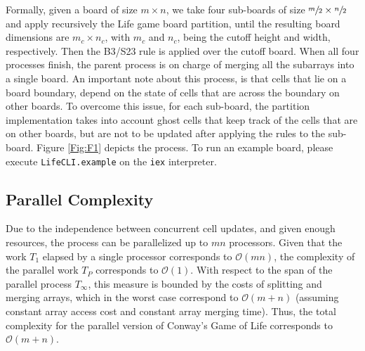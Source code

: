 \documentclass{article}
\begin{document}
Formally, given a board of size $m \times n$, we take four sub-boards of size $\sfrac{m}{2} \times \sfrac{n}{2}$ and apply recursively the Life game board partition, until the resulting board dimensions are $m_c \times n_c$, with $m_c$ and $n_c$, being the cutoff height and width, respectively. Then the B3/S23 rule is applied over the cutoff board. When all four processes finish, the parent process is on charge of merging all the subarrays into a single board. An important note about this process, is that cells that lie on a board boundary, depend on the state of cells that are across the boundary on other boards. To overcome this issue, for each sub-board, the partition implementation takes into account ghost cells that keep track of the cells that are on other boards, but are not to be updated after applying the rules to the sub-board. Figure \ref{Fig:F1} depicts the process. To run an example board, please execute \texttt{LifeCLI.example} on the \texttt{iex} interpreter.

\begin{figure*}[!htbp]
	 \centering
{}
\caption{Parallel Conway's Game of Life: First, given a board, padding is added such that boundary cells can be updated. Then, the active area is split into four subarrays and assigned to a parallel process, each one of them contain additional columns and rows that allow to update their corresponding boundary cells. When the array dimensions are lesser or equal to the cutoff value, the active area cells are updated in parallel. Finally, the parent process assembles the final board using the resulting active areas of each worker. }
\label{Fig:F1}
\end{figure*}



\subsection{Parallel Complexity}
Due to the independence between concurrent cell updates, and given enough resources, the process can be parallelized up to $mn$ processors. Given that the work $T_1$ elapsed by a single processor corresponds to $\mathcal{O}(mn)$, the complexity of the parallel work $T_P$ corresponds to $\mathcal{O}(1)$. With respect to the span of the parallel process $T_\infty$, this measure is bounded by the costs of splitting and merging arrays, which in the worst case correspond to $\mathcal{O}(m + n)$ (assuming constant array access cost and constant array merging time). Thus, the total complexity for the parallel version of Conway's Game of Life corresponds to $\mathcal{O}(m + n)$.  
\end{document}
